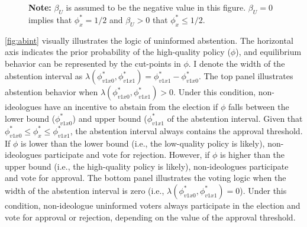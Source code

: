 \documentclass[letterpaper, 12pt]{article}
\newcommand{\floatnote}[1]{\vspace{\abovecaptionskip}\caption*{\textbf{Note:} #1}\vspace{-\abovecaptionskip}}
\begin{document}
\begin{figure}[t!]
\begin{center}
        \end{center}
        \floatnote{$\beta_U$ is assumed to be the negative value in this figure. $\beta_U=0$ implies that $\phi^*_x=1/2$ and $\beta_U>0$ that $\phi^*_x \leq 1/2$.}
    \end{figure}
    
    \par \autoref{fig:abint} visually illustrates the logic of uninformed abstention. The horizontal axis indicates the prior probability of the high-quality policy ($\phi$), and equilibrium behavior can be represented by the cut-points in $\phi$. I denote the width of the abstention interval as $\lambda(\phi^*_{v1x0},  \phi^*_{v1x1}) = \phi^*_{v1x1} - \phi^*_{v1x0}$. The top panel illustrates abstention behavior when $\lambda(\phi^*_{v1x0},  \phi^*_{v1x1}) > 0$. Under this condition, non-ideologues have an incentive to abstain from the election if $\phi$ falls between the lower bound ($\phi^*_{v1x0}$) and upper bound ($\phi^*_{v1x1}$ of the abstention interval. Given that $\phi^*_{v1x0} \leq  \phi^*_x \leq  \phi^*_{v1x1}$, the abstention interval always contains the approval threshold. If $\phi$ is lower than the lower bound (i.e., the low-quality policy is likely), non-ideologues participate and vote for rejection. However, if $\phi$ is higher than the upper bound (i.e., the high-quality policy is likely), non-ideologues participate and vote for approval. The bottom panel illustrates the voting logic when the width of the abstention interval is zero (i.e., $\lambda(\phi^*_{v1x0},  \phi^*_{v1x1}) =0$). Under this condition, non-ideologue uninformed voters always participate in the election and vote for approval or rejection, depending on the value of the approval threshold. 
    
\end{document}
